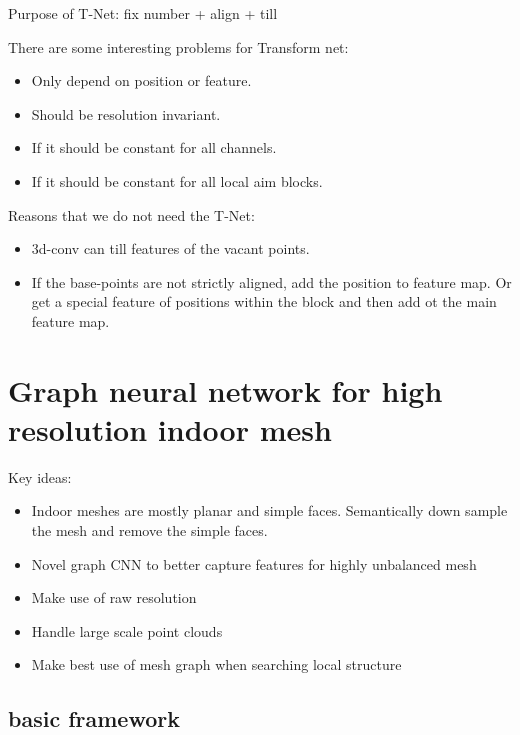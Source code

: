 \documentclass[,table,dvipsnames]{article}
\begin{document}
Purpose of T-Net: fix number + align + till \par
There are some interesting problems for Transform net:
\begin{itemize}
	\item Only depend on position or feature.
	\item Should be resolution invariant.
	\item If it should be constant for all channels.
	\item If it should be constant for all local aim blocks.
\end{itemize}
\par
Reasons that we do not need the T-Net:
\begin{itemize}
	\item 3d-conv can till features of the vacant points.
	\item If the base-points are not strictly aligned, add the position to feature map. Or get a special feature of positions within the block and then add ot the main feature map.
\end{itemize}
\par
{}

\section{Graph neural network for high resolution indoor mesh}

Key ideas:
\begin{itemize}
	\item Indoor meshes are mostly planar and simple faces. Semantically down sample the mesh and remove the simple faces.
	\item Novel graph CNN to better capture features for highly unbalanced mesh 
	\item Make use of raw resolution
	\item Handle large scale point clouds
	\item Make best use of mesh graph when searching local structure
\end{itemize}

\subsection{basic framework}
\end{document}
